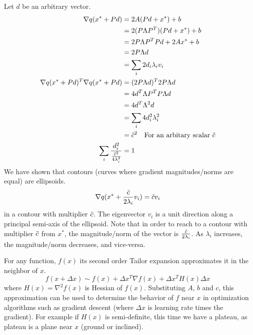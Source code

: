 \documentclass{article}
\numberwithin{equation}{subsection}
\begin{document}
Let $d$ be an arbitrary vector.
\begin{align}
    \nabla q(x^* + Pd) &= 2A(Pd + x^*)+b\\
    &= 2(P\Lambda P^T)(Pd + x^*)+b\\
    &= 2P\Lambda P^TPd + 2Ax^*+b\\
    &= 2P\Lambda d\\
    &= \sum_i 2d_i\lambda_i v_i\\
    \nabla q(x^*+Pd)^T \nabla q(x^*+Pd) &= (2P\Lambda d)^T2P\Lambda d\\
    &= 4d^T\Lambda P^TP\Lambda d\\
    &= 4d^T\Lambda^2 d\\
    &= \sum_i 4d_i^2  \lambda_i^2\\
    &= \Tilde{c}^2 \quad \text{For an arbitary scalar $\Tilde{c}$}\\
    \sum_i \frac{d_i^2}{\frac{\Tilde{c}^2}{4\lambda_i^2}} &= 1
\end{align}
We have shown that contours (curves where gradient magnitudes/norms are equal) are ellipsoids.
\begin{equation}
    \nabla q(x^* + \frac{\Tilde{c}}{2\lambda_i}v_i) = \Tilde{c}v_i
\end{equation}
in a contour with multiplier $\Tilde{c}$. The eigenvector $v_i$ is a unit direction along a principal semi-axis of the ellipsoid. Note that in order to reach to a contour with multiplier $\Tilde{c}$ from $x^*$, the magnitude/norm of the vector is $\frac{\Tilde{c}}{2\lambda_i}$. As $\lambda_i$ increases, the magnitude/norm decreases, and vice-versa.

For any function, $f(x)$ its second order Tailor expansion approximates it in the neighbor of $x$.
\begin{equation}
    f(x+\Delta x) \sim f(x)+\Delta x^T\nabla f(x)+\Delta x^TH(x)\Delta x
\end{equation}
where $H(x) = \nabla^2f(x)$ is Hessian of $f(x)$. Substituting $A$, $b$ and $c$, this approximation can be used to determine the behavior of $f$ near $x$ in optimization algorithms such as gradient descent (where $\Delta x$ is learning rate times the gradient). For example if $H(x)$ is semi-definite, this time we have a plateau, as plateau is a plane near $x$ (ground or inclined).
\end{document}
